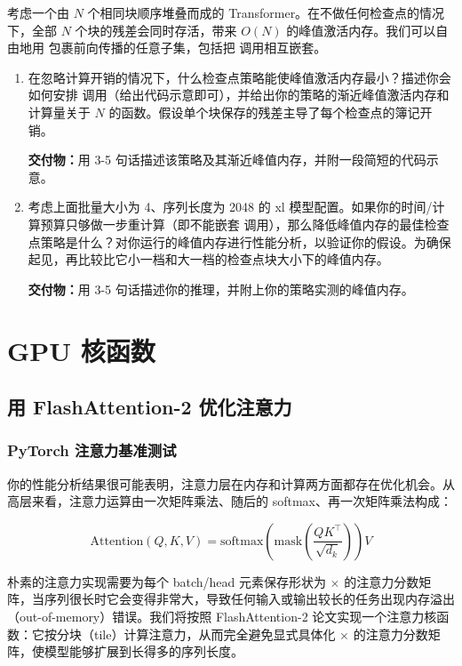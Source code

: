 考虑一个由 $N$ 个相同块顺序堆叠而成的 Transformer。在不做任何检查点的情况下，全部 $N$ 个块的残差会同时存活，带来 $O(N)$ 的峰值激活内存。我们可以自由地用  包裹前向传播的任意子集，包括把  调用相互嵌套。

\begin{enumerate}[label=(\alph*)]
  \item 在忽略计算开销的情况下，什么检查点策略能使峰值激活内存最小？描述你会如何安排  调用（给出代码示意即可），并给出你的策略的渐近峰值激活内存和计算量关于 $N$ 的函数。假设单个块保存的残差主导了每个检查点的簿记开销。

  \textbf{交付物：}用 3-5 句话描述该策略及其渐近峰值内存，并附一段简短的代码示意。

  \item 考虑上面批量大小为 4、序列长度为 2048 的 xl 模型配置。如果你的时间/计算预算只够做一步重计算（即不能嵌套  调用），那么降低峰值内存的最佳检查点策略是什么？对你运行的峰值内存进行性能分析，以验证你的假设。为确保起见，再比较比它小一档和大一档的检查点块大小下的峰值内存。

  \textbf{交付物：}用 3-5 句话描述你的推理，并附上你的策略实测的峰值内存。
\end{enumerate}

\section{GPU 核函数}

\subsection{用 FlashAttention-2 优化注意力}

\subsubsection{PyTorch 注意力基准测试}

你的性能分析结果很可能表明，注意力层在内存和计算两方面都存在优化机会。从高层来看，注意力运算由一次矩阵乘法、随后的 softmax、再一次矩阵乘法构成：

\begin{equation}
\mathrm{Attention}(Q, K, V) = \mathrm{softmax}\!\left(\mathrm{mask}\!\left(\frac{QK^{\top}}{\sqrt{d_k}}\right)\right)V
\end{equation}

朴素的注意力实现需要为每个 batch/head 元素保存形状为  $\times$  的注意力分数矩阵，当序列很长时它会变得非常大，导致任何输入或输出较长的任务出现内存溢出（out-of-memory）错误。我们将按照 FlashAttention-2 论文实现一个注意力核函数：它按分块（tile）计算注意力，从而完全避免显式具体化  $\times$  的注意力分数矩阵，使模型能够扩展到长得多的序列长度。

